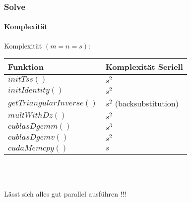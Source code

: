 \begin{frame}[fragile]
	\frametitle{Solve}
	\framesubtitle{Komplexität}
	Komplexität $(m=n=s)$: \\
	\begin{center}
		\begin{tabular}{ l | l}
			Funktion & Komplexität Seriell \\
			\hline
			$initTss()$	& $s^2$\\
			$initIdentity()$& $s^2$ \\
			$getTriangularInverse()$& $s^2$ (backsubstitution)\\
			$multWithDz()$  & $s^2$  \\
			$cublasDgemm()$& $s^3$ \\
			$cublasDgemv()$ & $s^2$ \\
			$cudaMemcpy()$ & $s$ \\
		\end{tabular} 	\\~\\
	\end{center}
	Lässt sich alles gut parallel ausführen !!!
\end{frame}
